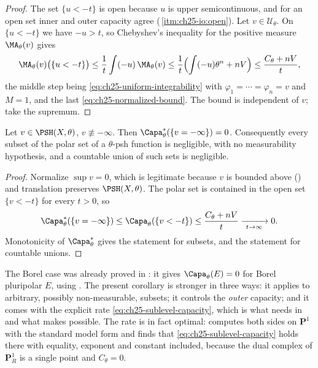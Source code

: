 \begin{proof}
The set \(\{u<-t\}\) is open because \(u\) is upper semicontinuous, and for
an open set inner and outer capacity agree
(\,\cref{itm:ch25-io:open}).  Let
\(v\in\mathcal U_\theta\).  On \(\{u<-t\}\) we have \(-u>t\), so Chebyshev's
inequality for the positive measure \(\MA_\theta(v)\) gives
\[
 \MA_\theta(v)\bigl(\{u<-t\}\bigr)
 \leq\frac1t\int(-u)\,\MA_\theta(v)
 \leq\frac1t\Bigl(\int(-u)\theta^n+nV\Bigr)
 \leq\frac{C_\theta+nV}{t},
\]
the middle step being \eqref{eq:ch25-uniform-integrability} with
\(\varphi_1=\cdots=\varphi_n=v\) and \(M=1\), and the last
\eqref{eq:ch25-normalized-bound}.  The bound is independent of \(v\); take
the supremum.
\end{proof}

\begin{corollary}
\label{cor:ch25-polar-negligible}
Let \(v\in\PSH(X,\theta)\), \(v\not\equiv-\infty\).  Then
\(\Capa^*_\theta(\{v=-\infty\})=0\).  Consequently every subset of the polar
set of a \(\theta\)-psh function is negligible, with no measurability
hypothesis, and a countable union of such sets is negligible.
\end{corollary}

\begin{proof}
Normalize \(\sup v=0\), which is legitimate because \(v\) is bounded above
() and translation preserves
\(\PSH(X,\theta)\).  The polar set is contained in the open set
\(\{v<-t\}\) for every \(t>0\), so
\[
 \Capa^*_\theta(\{v=-\infty\})
 \leq\Capa_\theta(\{v<-t\})\leq\frac{C_\theta+nV}{t}
 \xrightarrow[\ t\to\infty\ ]{}0 .
\]
Monotonicity of \(\Capa^*_\theta\) gives the statement for subsets, and
 the statement for countable unions.
\end{proof}

\begin{remark}
\label{rem:ch25-two-polar-proofs}
The Borel case was already proved in :
it gives \(\Capa_\theta(E)=0\) for Borel pluripolar \(E\), using
.  The present corollary is stronger in
three ways: it applies to arbitrary, possibly non-measurable, subsets; it
controls the \emph{outer} capacity; and it comes with the explicit rate
\eqref{eq:ch25-sublevel-capacity}, which is what
 needs in  and what makes
 possible.  The rate is in fact optimal:
 computes both sides on \(\mathbf P^1\)
with the standard model form and finds that
\eqref{eq:ch25-sublevel-capacity} holds there with equality, exponent and
constant included, because the dual complex of \(\mathbf P^1_R\) is a single
point and \(C_\theta=0\).
\end{remark}

